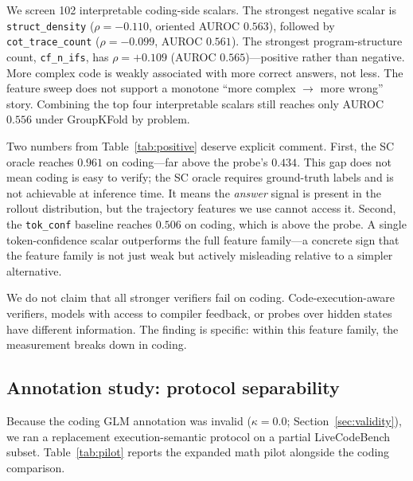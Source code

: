 \documentclass[10pt,twocolumn]{article}
\begin{document}
We screen 102 interpretable coding-side scalars. The strongest negative scalar is \texttt{struct\_density} ($\rho = -0.110$, oriented AUROC $0.563$), followed by \texttt{cot\_trace\_count} ($\rho = -0.099$, AUROC $0.561$). The strongest program-structure count, \texttt{cf\_n\_ifs}, has $\rho = +0.109$ (AUROC $0.565$)---positive rather than negative. More complex code is weakly associated with more correct answers, not less. The feature sweep does not support a monotone ``more complex $\to$ more wrong'' story. Combining the top four interpretable scalars still reaches only AUROC $0.556$ under GroupKFold by problem.

Two numbers from Table~\ref{tab:positive} deserve explicit comment. First, the SC oracle reaches $0.961$ on coding---far above the probe's $0.434$. This gap does not mean coding is easy to verify; the SC oracle requires ground-truth labels and is not achievable at inference time. It means the \emph{answer} signal is present in the rollout distribution, but the trajectory features we use cannot access it. Second, the \texttt{tok\_conf} baseline reaches $0.506$ on coding, which is above the probe. A single token-confidence scalar outperforms the full feature family---a concrete sign that the feature family is not just weak but actively misleading relative to a simpler alternative.

We do not claim that all stronger verifiers fail on coding. Code-execution-aware verifiers, models with access to compiler feedback, or probes over hidden states have different information. The finding is specific: within this feature family, the measurement breaks down in coding.

\subsection{Annotation study: protocol separability}

Because the coding GLM annotation was invalid ($\kappa = 0.0$; Section~\ref{sec:validity}), we ran a replacement execution-semantic protocol on a partial LiveCodeBench subset. Table~\ref{tab:pilot} reports the expanded math pilot alongside the coding comparison.
\end{document}
